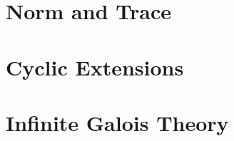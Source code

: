 \documentclass{report}
\begin{document}
\chapter{Norm and Trace}


\chapter{Cyclic Extensions}


\chapter{Infinite Galois Theory}



% 
\end{document}
